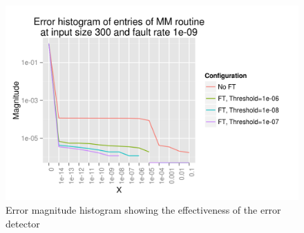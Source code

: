 \documentclass{sig-alternate}
\begin{document}
\begin{figure}[ht!]
\centering
\includegraphics[width=1.00\columnwidth]{figs/4_1_1_Exp2_1_Example.png}
\caption{Error magnitude histogram showing the effectiveness of the error detector}
\end{figure}
\end{document}
